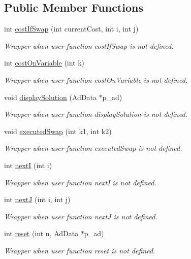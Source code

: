 \subsection*{\-Public \-Member \-Functions}
\begin{DoxyCompactItemize}
\item 
int \hyperlink{classBench_a5d88ce438e5ff9259f872bdcfe86621e}{cost\-If\-Swap} (int current\-Cost, int i, int j)
\begin{DoxyCompactList}\small\item\em \-Wrapper when user function cost\-If\-Swap is not defined. \end{DoxyCompactList}\item 
int \hyperlink{classBench_af27d153047259b80af7b556c0bfdadab}{cost\-On\-Variable} (int k)
\begin{DoxyCompactList}\small\item\em \-Wrapper when user function cost\-On\-Variable is not defined. \end{DoxyCompactList}\item 
void \hyperlink{classBench_a8f1d5b7a37082ec2f2bb15b9e3820c96}{display\-Solution} (\-Ad\-Data $\ast$p\-\_\-ad)
\begin{DoxyCompactList}\small\item\em \-Wrapper when user function display\-Solution is not defined. \end{DoxyCompactList}\item 
void \hyperlink{classBench_a0985e6c65a50742c898dd717dce2294c}{executed\-Swap} (int k1, int k2)
\begin{DoxyCompactList}\small\item\em \-Wrapper when user function executed\-Swap is not defined. \end{DoxyCompactList}\item 
int \hyperlink{classBench_a2ace948d46b3bcc7d76b2a4a32b427cd}{next\-I} (int i)
\begin{DoxyCompactList}\small\item\em \-Wrapper when user function next\-I is not defined. \end{DoxyCompactList}\item 
int \hyperlink{classBench_a5bc8976d21762350873d32e5f64a8d70}{next\-J} (int i, int j)
\begin{DoxyCompactList}\small\item\em \-Wrapper when user function next\-J is not defined. \end{DoxyCompactList}\item 
int \hyperlink{classBench_a0a317019a5065efe4bc37d1760379786}{reset} (int n, \-Ad\-Data $\ast$p\-\_\-ad)
\begin{DoxyCompactList}\small\item\em \-Wrapper when user function reset is not defined. \end{DoxyCompactList}\end{DoxyCompactItemize}
